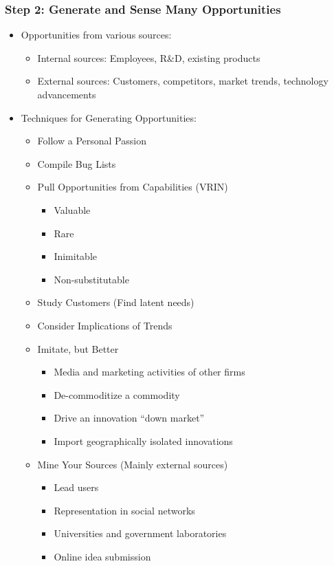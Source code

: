 \documentclass[a4paper,12pt,openany]{book}
\begin{document}
\subsubsection{Step 2: Generate and Sense Many Opportunities}
\begin{itemize}
    \item Opportunities from various sources:
    \begin{itemize}
        \item Internal sources: Employees, R\&D, existing products
        \item External sources: Customers, competitors, market trends, technology advancements
    \end{itemize}
    \item Techniques for Generating Opportunities:
    \begin{itemize}
        \item Follow a Personal Passion
        \item Compile Bug Lists
        \item Pull Opportunities from Capabilities (VRIN)
        \begin{itemize}
            \item Valuable
            \item Rare
            \item Inimitable
            \item Non-substitutable
        \end{itemize}
        \item Study Customers (Find latent needs)
        \item Consider Implications of Trends
        \item Imitate, but Better
        \begin{itemize}
            \item Media and marketing activities of other firms
            \item De-commoditize a commodity
            \item Drive an innovation ``down market''
            \item Import geographically isolated innovations
        \end{itemize}
        \item Mine Your Sources (Mainly external sources)
        \begin{itemize}
            \item Lead users
            \item Representation in social networks
            \item Universities and government laboratories
            \item Online idea submission
        \end{itemize}
    \end{itemize}
\end{itemize}
\end{document}

